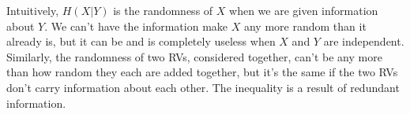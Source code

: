 \documentclass{article}
\begin{document}
Intuitively, $H(X|Y)$ is the randomness of $X$ when we are given information about $Y$. We can't have the information make $X$ any more random than it already is, but it can be and is completely useless when $X$ and $Y$ are independent. Similarly, the randomness of two RVs, considered together, can't be any more than how random they each are added together, but it's the same if the two RVs don't carry information about each other. The inequality is a result of redundant information.
\end{document}
